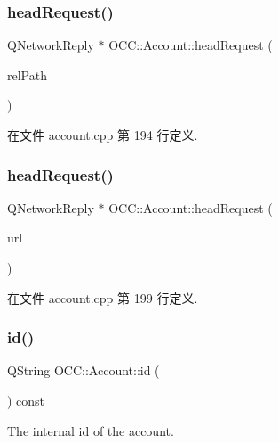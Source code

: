 \subsubsection{\texorpdfstring{head\+Request()}{headRequest()}\hspace{0.1cm}{\footnotesize\ttfamily [1/2]}}
{\footnotesize\ttfamily Q\+Network\+Reply $\ast$ O\+C\+C\+::\+Account\+::head\+Request (\begin{DoxyParamCaption}\item[{const Q\+String \&}]{rel\+Path }\end{DoxyParamCaption})}



在文件 account.\+cpp 第 194 行定义.

\mbox{\label{class_o_c_c_1_1_account_acc5eabb1b75e96f17046c1d93e3ac874}} 
\subsubsection{\texorpdfstring{head\+Request()}{headRequest()}\hspace{0.1cm}{\footnotesize\ttfamily [2/2]}}
{\footnotesize\ttfamily Q\+Network\+Reply $\ast$ O\+C\+C\+::\+Account\+::head\+Request (\begin{DoxyParamCaption}\item[{const Q\+Url \&}]{url }\end{DoxyParamCaption})}



在文件 account.\+cpp 第 199 行定义.

\mbox{\label{class_o_c_c_1_1_account_a14c815f39fec803bf76c3a6b8fd97a7d}} 
\subsubsection{\texorpdfstring{id()}{id()}}
{\footnotesize\ttfamily Q\+String O\+C\+C\+::\+Account\+::id (\begin{DoxyParamCaption}{ }\end{DoxyParamCaption}) const}



The internal id of the account. 



